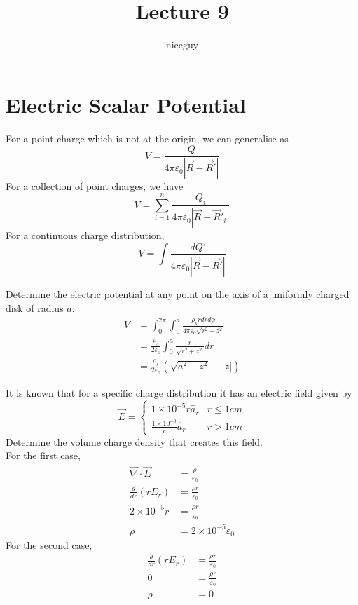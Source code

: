 \documentclass[12pt]{article}
\author{niceguy}
\title{Lecture 9}
\begin{document}
\maketitle

\section{Electric Scalar Potential}

For a point charge which is not at the origin, we can generalise as
$$V = \frac{Q}{4\pi\varepsilon_0|\vec{R}-\vec{R}'|}$$
For a collection of point charges, we have
$$V = \sum_{i=1}^n \frac{Q_i}{4\pi\varepsilon_0|\vec{R}-\vec{R}'_i|}$$
For a continuous charge distribution,
$$V = \int\frac{dQ'}{4\pi\varepsilon_0|\vec{R}-\vec{R}'|}$$

\begin{ex}
	Determine the electric potential at any point on the axis of a uniformly charged disk of radius $a$.
	\begin{align*}
		V &= \int_0^{2\pi}\int_0^a \frac{\rho_srdrd\phi}{4\pi\varepsilon_0\sqrt{r^2+z^2}} \\
		  &= \frac{\rho_s}{2\varepsilon_0} \int_0^a \frac{r}{\sqrt{r^2+z^2}}dr \\
		  &= \frac{\rho_s}{2\varepsilon_0}\left(\sqrt{a^2+z^2}-|z|\right)
	\end{align*}
\end{ex}

\begin{ex}
	It is known that for a specific charge distribution it has an electric field given by
	$$\vec{E} = \begin{cases} 1\times10^{-5}r\hat{a}_r & r\leq 1\unit{cm} \\ \frac{1\times10^{-9}}{r}\hat{a}_r & r>1\unit{cm}\end{cases}$$
	Determine the volume charge density that creates this field. \\
	For the first case,
	\begin{align*}
		\vec{\nabla}\cdot\vec{E} &= \frac{\rho}{\varepsilon_0} \\
		\frac{d}{dr}\left(rE_r\right) &= \frac{\rho r}{\varepsilon_0} \\
		2\times10^{-5}r &= \frac{\rho r}{\varepsilon_0} \\
		\rho &= 2\times10^{-5}\varepsilon_0
	\end{align*}
	For the second case,
	\begin{align*}
		\frac{d}{dr}\left(rE_r\right) &= \frac{\rho r}{\varepsilon_0} \\
		0 &= \frac{\rho r}{\varepsilon_0} \\
		\rho &= 0
	\end{align*}
\end{ex}
\end{document}
